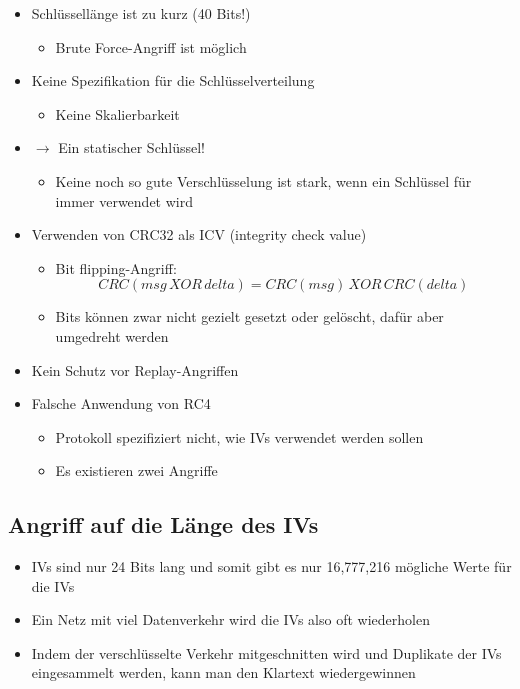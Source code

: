\documentclass[openany]{book}
\begin{document}
\begin{itemize}
    \item Schlüssellänge ist zu kurz (40 Bits!)
    \begin{itemize}
        \item Brute Force-Angriff ist möglich
    \end{itemize}
    \item Keine Spezifikation für die Schlüsselverteilung
    \begin{itemize}
        \item Keine Skalierbarkeit
    \end{itemize}
    \item $\rightarrow$ Ein statischer Schlüssel!
    \begin{itemize}
        \item Keine noch so gute Verschlüsselung ist stark, wenn ein Schlüssel für immer verwendet wird
    \end{itemize}
    \item Verwenden von CRC32 als ICV (integrity check value)
    \begin{itemize}
        \item Bit flipping-Angriff: $$CRC(msg\, XOR\, delta)=CRC(msg)\, XOR\, CRC(delta)$$
        \item Bits können zwar nicht gezielt gesetzt oder gelöscht, dafür aber umgedreht werden
    \end{itemize}
    \item Kein Schutz vor Replay-Angriffen
    \item Falsche Anwendung von RC4
    \begin{itemize}
        \item Protokoll spezifiziert nicht, wie IVs verwendet werden sollen
        \item Es existieren zwei Angriffe
    \end{itemize}
\end{itemize}

\subsection{Angriff auf die Länge des IVs}

\begin{itemize}
    \item IVs sind nur 24 Bits lang und somit gibt es nur 16,777,216 mögliche Werte für die IVs
    \item Ein Netz mit viel Datenverkehr wird die IVs also oft wiederholen
    \item Indem der verschlüsselte Verkehr mitgeschnitten wird und Duplikate der IVs eingesammelt werden, kann man den Klartext wiedergewinnen
\end{itemize}
\end{document}

